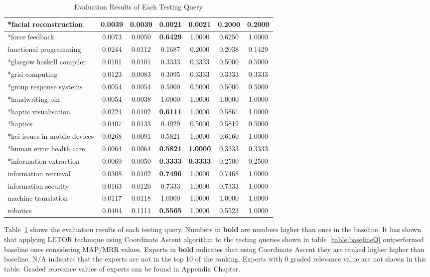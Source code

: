 \begin{table}
{\begin{tabular}{|l|c|c|c|c|c|c|}
\hline *facial reconstruction & 0.0039 & 0.0039 & 0.0021 & 0.0021 & 0.2000 & 0.2000 \\
\hline *force feedback & 0.0073 & 0.0050 & \textbf{0.6429} & 1.0000 & 0.6250 & 1.0000 \\
\hline functional programming & 0.0244 & 0.0112 & 0.1687 & 0.2000 & 0.2038 & 0.1429 \\
\hline *glasgow haskell compiler & 0.0101 & 0.0101 & 0.3333 & 0.3333 & 0.5000 & 0.5000 \\
\hline *grid computing & 0.0123 & 0.0083 & 0.3095 & 0.3333 & 0.3333 & 0.3333 \\
\hline *group response systems & 0.0054 & 0.0054 & 0.5000 & 0.5000 & 0.5000 & 0.5000 \\
\hline *handwriting pin & 0.0054 & 0.0038 & 1.0000 & 1.0000 & 1.0000 & 1.0000 \\
\hline *haptic visualisation & 0.0224 & 0.0102 & \textbf{0.6111} & 1.0000 & 0.5861 & 1.0000 \\
\hline *haptics & 0.0407 & 0.0133 & 0.4929 & 0.5000 & 0.5819 & 0.5000 \\
\hline *hci issues in mobile devices & 0.0268 & 0.0091 & 0.5821 & 1.0000 & 0.6160 & 1.0000 \\
\hline *human error health care & 0.0064 & 0.0064 & \textbf{0.5821} & \textbf{1.0000} & 0.3333 & 0.3333 \\
\hline *information extraction & 0.0069 & 0.0050 & \textbf{0.3333} & \textbf{0.3333} & 0.2500 & 0.2500 \\
\hline information retrieval & 0.0308 & 0.0102 & \textbf{0.7496} & 1.0000 & 0.7468 & 1.0000 \\
\hline information security & 0.0163 & 0.0120 & 0.7333 & 1.0000 & 0.7333 & 1.0000 \\
\hline machine translation & 0.0117 & 0.0118 & 1.0000 & 1.0000 & 1.0000 & 1.0000 \\
\hline robotics & 0.0404 & 0.1111 & \textbf{0.5565} & 1.0000 & 0.5523 & 1.0000\\
\hline

\end{tabular}
}
\caption{Evaluation Results of Each Testing Query} \label{table:eachqueryevaluationresult}
\end{table}

Table~\ref{table:eachqueryevaluationresult} shows the evaluation results of each testing query. Numbers in \textbf{bold}
are numbers higher than ones in the baseline. It has shown that applying LETOR technique using
Coordinate Ascent algorithm to the testing queries shown in table~\ref{table:baselineQ} outperformed baseline ones considering MAP/MRR values.
Experts in \textbf{bold} indicates that using Coordinate Ascent they are ranked higher higher than baseline. N/A indicates that the experts 
are not in the top 10 of the ranking. Experts with 0 graded relevance value are not shown in this table. Graded relevance values of experts can be 
found in Appendix Chapter.

